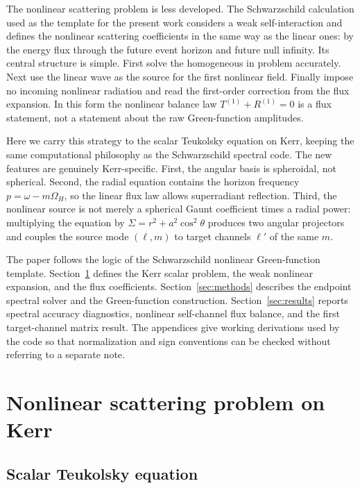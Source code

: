 \documentclass[aps,prd,twocolumn,nofootinbib,superscriptaddress,10pt,floatfix]{revtex4-2}
\newcommand{\OmH}{\Omega_H}
\begin{document}
The nonlinear scattering problem is less developed.  The Schwarzschild
calculation used as the template for the present work considers a weak
self-interaction and defines the nonlinear scattering coefficients in the same
way as the linear ones: by the energy flux through the future event horizon and
future null infinity.  Its central structure is simple.  First solve the
homogeneous in problem accurately.  Next use the linear wave as the source for
the first nonlinear field.  Finally impose no incoming nonlinear radiation and
read the first-order correction from the flux expansion.  In this form the
nonlinear balance law $T^{(1)}+R^{(1)}=0$ is a flux statement, not a statement
about the raw Green-function amplitudes.

Here we carry this strategy to the scalar Teukolsky equation on Kerr, keeping
the same computational philosophy as the Schwarzschild spectral code.  The new
features are genuinely Kerr-specific.  First, the angular basis is spheroidal,
not spherical.  Second, the radial equation contains the horizon frequency
$p=\omega-m\OmH$, so the linear flux law allows superradiant reflection.
Third, the nonlinear source is not merely a spherical Gaunt coefficient times a
radial power: multiplying the equation by
$\Sigma=r^2+a^2\cos^2\theta$ produces two angular projectors and couples the
source mode $(\ell,m)$ to target channels $\ell'$ of the same $m$.

The paper follows the logic of the Schwarzschild nonlinear Green-function
template.  Section~\ref{sec:setup} defines the Kerr scalar problem, the weak
nonlinear expansion, and the flux coefficients.  Section~\ref{sec:methods}
describes the endpoint spectral solver and the Green-function construction.
Section~\ref{sec:results} reports spectral accuracy diagnostics, nonlinear
self-channel flux balance, and the first target-channel matrix result.  The
appendices give working derivations used by the code so that normalization and
sign conventions can be checked without referring to a separate note.

\section{Nonlinear scattering problem on Kerr}
\label{sec:setup}

\subsection{Scalar Teukolsky equation}
\end{document}
